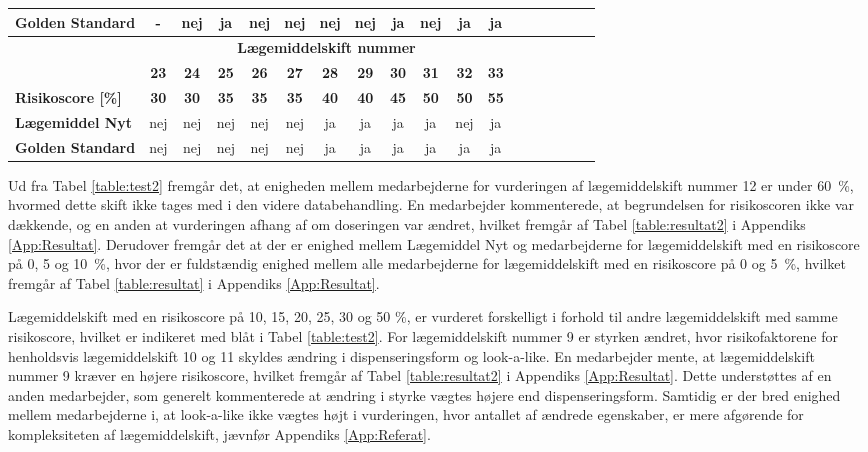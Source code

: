 \begin{longtable}{|l|c|c|c|c|c|c|c|c|c|c|c|c|c|c|c|c|c|}
\cellcolor[HTML]{C0C0C0}\textbf{Golden Standard} & \cellcolor[HTML]{F6E6E5} - & nej & \cellcolor[HTML]{32CB00}ja & nej & nej & nej & \cellcolor[HTML]{32CB00}nej & \cellcolor[HTML]{32CB00} ja & \cellcolor[HTML]{32CB00}nej & \cellcolor[HTML]{32CB00}ja & ja \\ \hline
\rowcolor[HTML]{C0C0C0} & \multicolumn{11}{|c|}{\textbf{Lægemiddelskift nummer}} \\ 
\rowcolor[HTML]{C0C0C0} & \textbf{23} & \textbf{24} & \textbf{25} & \textbf{26} & \textbf{27} & \textbf{28} &  \textbf{29} & \textbf{30} & \textbf{31} & \textbf{32} & \textbf{33}  \\ \cline{1-10}
\cellcolor[HTML]{C0C0C0}\textbf{Risikoscore [\%]} & \textbf{30} & \textbf{30} & \textbf{35} & \textbf{35} & \textbf{35} & \textbf{40} & \textbf{40} & \textbf{45} & \textbf{50} & \cellcolor[HTML]{34CDF9}\textbf{50} & \textbf{55} \\ \hline 
\cellcolor[HTML]{C0C0C0}\textbf{Lægemiddel Nyt} & nej & nej & nej & nej & nej & ja & ja & ja & ja & \cellcolor[HTML]{32CB00} nej & ja\\ \hline
\cellcolor[HTML]{C0C0C0}\textbf{Golden Standard} & nej & nej & nej & nej & nej & ja & ja& ja & ja&\cellcolor[HTML]{32CB00}ja & ja \\\hline
\end{longtable}
\vspace{0.5cm}

Ud fra Tabel \ref{table:test2} fremgår det, at enigheden mellem medarbejderne for vurderingen af lægemiddelskift nummer 12 er under 60~\%, hvormed dette skift ikke tages med i den videre databehandling. En medarbejder kommenterede, at begrundelsen for risikoscoren ikke var dækkende, og en anden at vurderingen  afhang af om doseringen var ændret, hvilket fremgår af Tabel \ref{table:resultat2} i Appendiks \ref{App:Resultat}. %
Derudover fremgår det at der er enighed mellem Lægemiddel Nyt og medarbejderne for lægemiddelskift med en risikoscore på 0, 5 og 10~\%, hvor der er  fuldstændig enighed mellem alle medarbejderne for lægemiddelskift med en risikoscore på 0 og 5~\%, hvilket fremgår af Tabel \ref{table:resultat} i Appendiks \ref{App:Resultat}.

Lægemiddelskift med en risikoscore på 10, 15, 20, 25, 30 og 50 \%, er vurderet forskelligt i forhold til andre lægemiddelskift med samme risikoscore, hvilket er indikeret med blåt i Tabel \ref{table:test2}. For lægemiddelskift nummer 9 er styrken ændret, hvor risikofaktorene for henholdsvis lægemiddelskift 10 og 11 skyldes ændring i dispenseringsform og look-a-like. En medarbejder mente, at lægemiddelskift nummer 9 kræver en højere risikoscore, hvilket fremgår af Tabel \ref{table:resultat2} i Appendiks \ref{App:Resultat}. Dette understøttes af en anden medarbejder, som generelt kommenterede at ændring i styrke vægtes højere end dispenseringsform. Samtidig er der bred enighed mellem medarbejderne i, at look-a-like ikke vægtes højt i vurderingen, hvor antallet af ændrede egenskaber,  er mere afgørende for kompleksiteten af lægemiddelskift, jævnfør Appendiks \ref{App:Referat}. 

